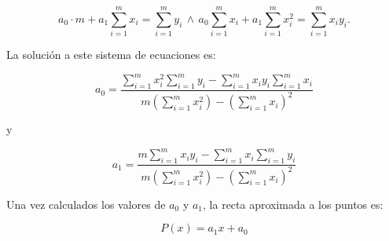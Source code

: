 $$a_0\cdot m + a_1\sum_{i=1}^{m}x_i = \sum_{i=1}^{m}y_i
\,\wedge\,
a_0\sum_{i=1}^{m}x_i + a_{1}\sum_{i=1}^{m}x_i^2 = \sum_{i=1}^{m}x_iy_i.$$

La solución a este sistema de ecuaciones es:

\begin{equation}
	a_0 = \dfrac{\sum_{i=1}^{m}x_i^2 \sum_{i=1}^{m}y_i - \sum_{i=1}^{m}x_iy_i \sum_{i=1}^m x_i}{m \left(\displaystyle{\sum_{i=1}^{m}x_i^2}\right) - 
	\left(\displaystyle{\sum_{i=1}^m x_i}\right)^2}
	\label{eq:minimosCuadrados1}
\end{equation}

y

\begin{equation}
	a_1 = \dfrac{m\sum_{i=1}^{m}x_iy_i - \sum_{i=1}^{m}x_i \sum_{i=1}^m y_i}{m \left(\displaystyle{\sum_{i=1}^{m}x_i^2}\right) - 
	\left(\displaystyle{\sum_{i=1}^m x_i}\right)^2}
	\label{eq:minimosCuadrados2}
\end{equation}

Una vez calculados los valores de $a_0$ y $a_1$, la recta aproximada a los puntos es:

\begin{equation}
	P(x) = a_1x+a_0
	\label{eq:minimosCuadrados3}
\end{equation}

